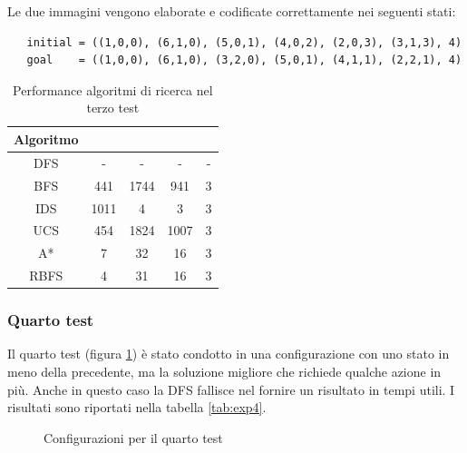 \documentclass{article}
\begin{document}
	\noindent Le due immagini vengono elaborate e codificate correttamente nei seguenti stati:
	\begin{verbatim}
   initial = ((1,0,0), (6,1,0), (5,0,1), (4,0,2), (2,0,3), (3,1,3), 4)
   goal    = ((1,0,0), (6,1,0), (3,2,0), (5,0,1), (4,1,1), (2,2,1), 4)
	\end{verbatim}

	\begin{table}[H]
		\centering
		\def\arraystretch{1.5}
		\begin{tabular}{|c|c|c|c|c|}
			\hline
			\textbf{Algoritmo} & \bm{$n$} & \bm{$m$} & \bm{$\mu$} & \bm{$l$} \\
			\hline
			DFS & - & - & - & - \\
			\hline
			BFS & 441 & 1744 & 941 & 3 \\
			\hline
			IDS &  1011 & 4 & 3 & 3 \\
			\hline
			UCS &  454 & 1824 & 1007 & 3 \\
			\hline
			A* &  7 & 32 & 16 & 3 \\
			\hline
			RBFS & 4 & 31 & 16 & 3   \\
			\hline
		\end{tabular}
		\caption{Performance algoritmi di ricerca nel terzo test}
		\label{tab:exp3}
	\end{table}


	\subsubsection{Quarto test}
	Il quarto test (figura \ref{fig:exp4}) è stato condotto in una configurazione con uno stato in meno della precedente, ma la soluzione migliore che richiede qualche azione in più. Anche in questo caso la DFS fallisce nel fornire un risultato in tempi utili. I risultati sono riportati nella tabella \ref{tab:exp4}.
	\begin{figure}[H]
		\centering
		\protect\caption{Configurazioni per il quarto test}
		\label{fig:exp4}
	\end{figure}
	
\end{document}
